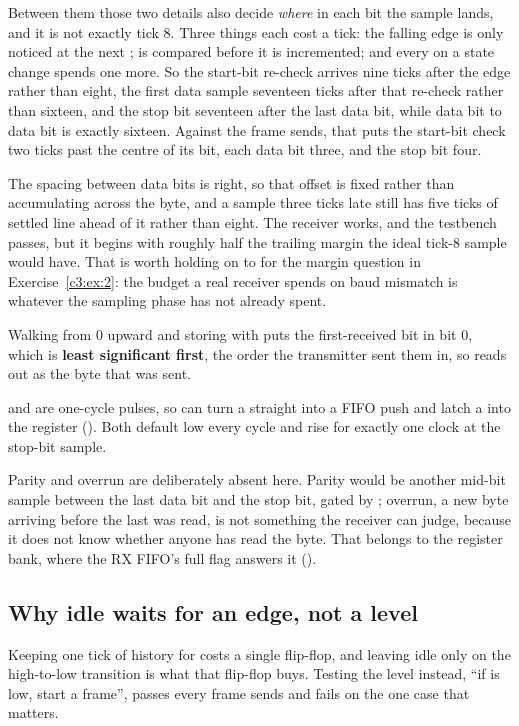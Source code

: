 Between them those two details also decide \emph{where} in each bit the sample lands, and it is not
exactly tick 8. Three things each cost a tick: the falling edge is only noticed at the next
;  is compared before it is incremented; and every  on a
state change spends one more. So the start-bit re-check arrives nine ticks after the edge rather
than eight, the first data sample seventeen ticks after that re-check rather than sixteen, and the
stop bit seventeen after the last data bit, while data bit to data bit is exactly sixteen. Against
the frame  sends, that puts the start-bit check two ticks past the centre of its
bit, each data bit three, and the stop bit four.

The spacing between data bits is right, so that offset is fixed rather than accumulating across the
byte, and a sample three ticks late still has five ticks of settled line ahead of it rather than
eight. The receiver works, and the testbench passes, but it begins with roughly half the trailing
margin the ideal tick-8 sample would have. That is worth holding on to for the margin question in
Exercise~\ref{c3:ex:2}: the budget a real receiver spends on baud mismatch is whatever the sampling
phase has not already spent.

Walking  from 0 upward and storing with  puts the
first-received bit in bit 0, which is \textbf{least significant first}, the order the transmitter
sent them in, so  reads out as the byte that was sent.

 and  are one-cycle pulses, so  can turn a 
straight into a FIFO push and latch a  into the  register
(). Both default low every cycle and rise for exactly one clock at the stop-bit sample.

Parity and overrun are deliberately absent here. Parity would be another mid-bit sample between the
last data bit and the stop bit, gated by ; overrun, a new byte arriving before the last
was read, is not something the receiver can judge, because it does not know whether anyone has read
the byte. That belongs to the register bank, where the RX FIFO's full flag answers it
().

\subsection{Why idle waits for an edge, not a level}
\label{c3:sec:uart_rx_edge}
Keeping one tick of history for  costs a single flip-flop, and leaving idle only on the
high-to-low transition is what that flip-flop buys. Testing the level instead, ``if  is
low, start a frame'', passes every frame  sends and fails on the one case that
matters.

